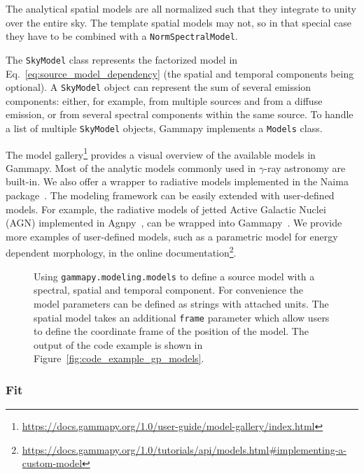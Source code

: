 \documentclass[longauth]{aa}
\newcommand{\code}[1]{\texttt{#1}}
\newcommand{\gammapy}{Gammapy\xspace}
\newcommand{\agnpy}{Agnpy\xspace}
\newcommand{\gammaray}{$\gamma$-ray\xspace}
\begin{document}
The analytical spatial models are all normalized such that they integrate to
unity over the entire sky. The template spatial models may not, so in that special
case they have to be combined with a \code{NormSpectralModel}.

The \code{SkyModel} class represents the factorized model in Eq.~\ref{eq:source_model_dependency}
(the spatial and temporal components being optional).
A \code{SkyModel} object can represent the sum of several emission components:
either, for example, from multiple sources and from a diffuse emission, or from several spectral
components within the same source. To handle a list of multiple \code{SkyModel} objects, \gammapy
implements a \code{Models} class.

The model gallery\footnote{\url{https://docs.gammapy.org/1.0/user-guide/model-gallery/index.html}}
 provides a visual overview of the available models in
\gammapy. Most of the analytic models commonly used in \gammaray astronomy are
built-in. We also offer a wrapper to radiative models implemented in the Naima
package~\citep{naima}. The modeling framework can be easily extended with
user-defined models. For example, the radiative models of jetted Active Galactic Nuclei (AGN)
implemented in \agnpy~\citep{agnpy2022}, can be wrapped into 
\gammapy~\citep[see Section 3.5 of ][]{2022A&A...660A..18N}. We provide 
more examples of user-defined models, such as a parametric model for energy dependent morphology,
in the online documentation\footnote{\url{https://docs.gammapy.org/1.0/tutorials/api/models.html\#implementing-a-custom-model}}.


\begin{figure}
        \small
        \caption{Using \code{gammapy.modeling.models} to define a source model with a
    spectral, spatial and temporal component. For convenience the model
    parameters can be defined as strings with attached units. The spatial model
    takes an additional \code{frame} parameter which allow users to define
    the coordinate frame of the position of the model. The output
        of the code example is shown in Figure~\ref{fig:code_example_gp_models}.
    }
        \label{fig*:minted:gp_models}
\end{figure}

\subsubsection{Fit}
\label{sssec:fit}
\end{document}
